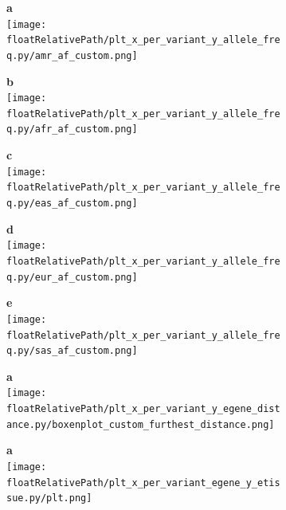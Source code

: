 \begin{figure}[!tbp]

    \begin{subfigure}[]{.49\textwidth}
        \textbf{a}
        \\
        \texttt{[image: \\floatRelativePath/plt\_x\_per\_variant\_y\_allele\_freq.py/amr\_af\_custom.png]}
    \end{subfigure}
%
    \begin{subfigure}[]{.49\textwidth}
        \textbf{b}
        \\
        \texttt{[image: \\floatRelativePath/plt\_x\_per\_variant\_y\_allele\_freq.py/afr\_af\_custom.png]}
    \end{subfigure}

    \begin{subfigure}[]{.49\textwidth}
        \textbf{c}
        \\
        \texttt{[image: \\floatRelativePath/plt\_x\_per\_variant\_y\_allele\_freq.py/eas\_af\_custom.png]}
    \end{subfigure}
%
    \centering
    \begin{subfigure}[]{.49\textwidth}
        \textbf{d}
        \\
        \texttt{[image: \\floatRelativePath/plt\_x\_per\_variant\_y\_allele\_freq.py/eur\_af\_custom.png]}
    \end{subfigure}

    \begin{subfigure}[]{.32\textwidth}
        \textbf{e}
        \\
        \texttt{[image: \\floatRelativePath/plt\_x\_per\_variant\_y\_allele\_freq.py/sas\_af\_custom.png]}
    \end{subfigure}

    \caption{}

\end{figure}


\begin{figure}[!ht]

    \begin{subfigure}[]{.49\textwidth}
        \centering
        \textbf{a}
        \\
        \texttt{[image: \\floatRelativePath/plt\_x\_per\_variant\_y\_egene\_distance.py/boxenplot\_custom\_furthest\_distance.png]}
    \end{subfigure}

    \caption{}

\end{figure}


\begin{figure}[!ht]

    \begin{subfigure}[]{.49\textwidth}
        \textbf{a}
        \\
        \texttt{[image: \\floatRelativePath/plt\_x\_per\_variant\_egene\_y\_etissue.py/plt.png]}
    \end{subfigure}

    \caption{}

\end{figure}



